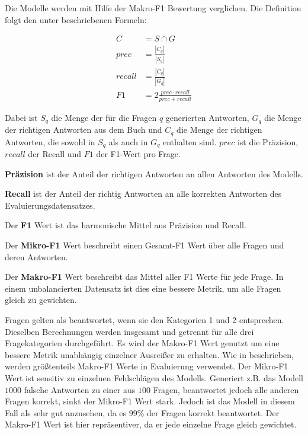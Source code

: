 Die Modelle werden mit Hilfe der Makro-F1 Bewertung verglichen.
Die Definition folgt den unter \citet{chatgpt_qas} beschriebenen Formeln:
\begin{ceqn}
\begin{align}
    C &= S \cap G \\
    prec &= \frac{|C_{q}|}{|S_{q}|} \\
    recall &= \frac{|C_{q}|}{|G_{q}|} \\
    F1 &= 2\frac{prec \cdot recall}{prec + recall}
\end{align}
\end{ceqn}
Dabei ist $S_q$ die Menge der für die Fragen $q$ generierten Antworten, $G_q$ die Menge der richtigen Antworten aus dem Buch \citet{bb} und $C_q$ die Menge der richtigen Antworten, die sowohl in $S_q$ als auch in $G_q$ enthalten sind.
$prec$ ist die Präzision, $recall$ der Recall und $F1$ der F1-Wert pro Frage.
\begin{definition}
    \textbf{Präzision} ist der Anteil der richtigen Antworten an allen Antworten des Modells.
\end{definition}

\begin{definition}
    \textbf{Recall} ist der Anteil der richtig Antworten an alle korrekten Antworten des Evaluierungsdatensatzes.
\end{definition}

\begin{definition}
    Der \textbf{F1} Wert ist das harmonische Mittel aus Präzision und Recall.
\end{definition}

\begin{definition}\label{def:micro-f1}
    Der \textbf{Mikro-F1} Wert beschreibt einen Gesamt-F1 Wert über alle Fragen und deren Antworten.
\end{definition}

\begin{definition}\label{def:macro-f1}
    Der \textbf{Makro-F1} Wert beschreibt das Mittel aller F1 Werte für jede Frage.
    In einem unbalancierten Datensatz ist dies eine bessere Metrik, um alle Fragen gleich zu gewichten.
\end{definition}

Fragen gelten als beantwortet, wenn sie den Kategorien 1 und 2 entsprechen.
Dieselben Berechnungen werden insgesamt und getrennt für alle drei Fragekategorien durchgeführt.
Es wird der Makro-F1 Wert genutzt um eine bessere Metrik unabhängig einzelner Ausreißer zu erhalten.
Wie in \citet{qald9} beschrieben, werden größtenteils Makro-F1 Werte in Evaluierung verwendet.
Der Mikro-F1 Wert ist sensitiv zu einzelnen Fehlschlägen des Modells.
Generiert z.B. das Modell $1000$ falsche Antworten zu einer aus $100$ Fragen, beantwortet jedoch alle anderen Fragen korrekt, sinkt der Mikro-F1 Wert stark.
Jedoch ist das Modell in diesem Fall als sehr gut anzusehen, da es $99\%$ der Fragen korrekt beantwortet.
Der Makro-F1 Wert ist hier repräsentiver, da er jede einzelne Frage gleich gewichtet.\\

